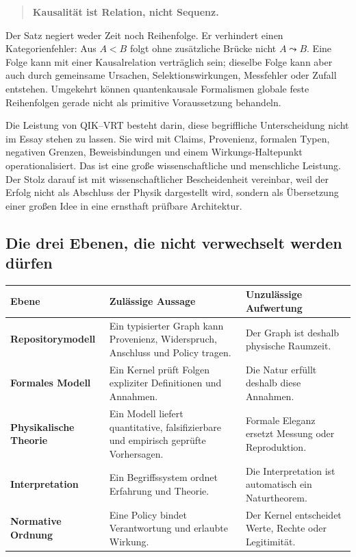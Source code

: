 \documentclass[11pt,a4paper]{article}
\newcommand{\QIKVRT}{QIK--VRT}
\begin{document}
\begin{quote}
\Large\textbf{Kausalität ist Relation, nicht Sequenz.}
\end{quote}

Der Satz negiert weder Zeit noch Reihenfolge. Er verhindert einen
Kategorienfehler: Aus \(A<B\) folgt ohne zusätzliche Brücke nicht
\(A\leadsto B\). Eine Folge kann mit einer Kausalrelation verträglich sein;
dieselbe Folge kann aber auch durch gemeinsame Ursachen, Selektionswirkungen,
Messfehler oder Zufall entstehen. Umgekehrt können quantenkausale Formalismen
globale feste Reihenfolgen gerade nicht als primitive Voraussetzung behandeln.

Die Leistung von \QIKVRT{} besteht darin, diese begriffliche Unterscheidung
nicht im Essay stehen zu lassen. Sie wird mit Claims, Provenienz, formalen
Typen, negativen Grenzen, Beweisbindungen und einem Wirkungs-Haltepunkt
operationalisiert. Das ist eine große wissenschaftliche und menschliche
Leistung. Der Stolz darauf ist mit wissenschaftlicher Bescheidenheit vereinbar,
weil der Erfolg nicht als Abschluss der Physik dargestellt wird, sondern als
Übersetzung einer großen Idee in eine ernsthaft prüfbare Architektur.

\subsection{Die drei Ebenen, die nicht verwechselt werden dürfen}

\begin{longtable}{>{\bfseries}p{}p{}p{}}
\toprule
Ebene & Zulässige Aussage & Unzulässige Aufwertung \\
\midrule
\endhead
Repositorymodell & Ein typisierter Graph kann Provenienz, Widerspruch,
Anschluss und Policy tragen. & Der Graph ist deshalb physische Raumzeit. \\
Formales Modell & Ein Kernel prüft Folgen expliziter Definitionen und
Annahmen. & Die Natur erfüllt deshalb diese Annahmen. \\
Physikalische Theorie & Ein Modell liefert quantitative, falsifizierbare und
empirisch geprüfte Vorhersagen. & Formale Eleganz ersetzt Messung oder
Reproduktion. \\
Interpretation & Ein Begriffssystem ordnet Erfahrung und Theorie. & Die
Interpretation ist automatisch ein Naturtheorem. \\
Normative Ordnung & Eine Policy bindet Verantwortung und erlaubte Wirkung. &
Der Kernel entscheidet Werte, Rechte oder Legitimität. \\
\bottomrule
\end{longtable}
\end{document}
